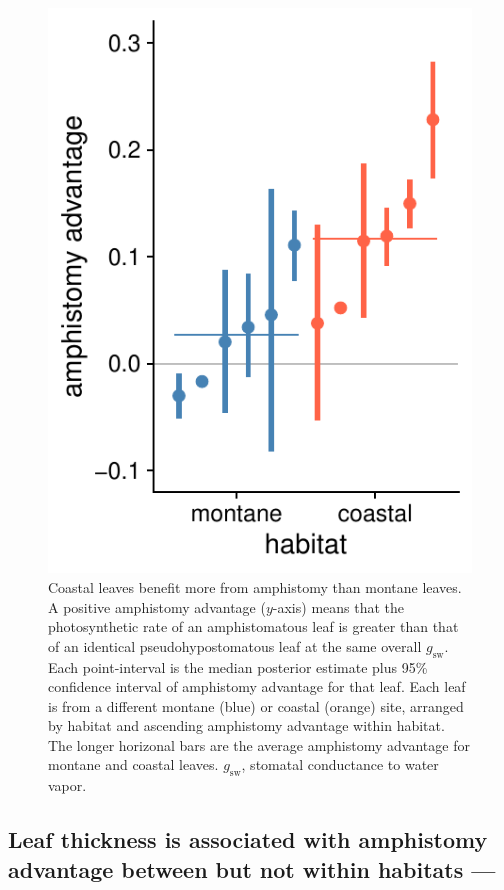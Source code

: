 \documentclass[
  letterpaper,
  DIV=11,
  numbers=noendperiod]{scrartcl}
\begin{document}
\begin{figure}[H]
  \includegraphics{../figures/habitat-aa.pdf}
  \caption{Coastal leaves benefit more from amphistomy than montane leaves. A positive amphistomy advantage ($y$-axis) means that the photosynthetic rate of an amphistomatous leaf is greater than that of an identical pseudohypostomatous leaf at the same overall $g_\mathrm{sw}$. Each point-interval is the median posterior estimate plus 95\% confidence interval of amphistomy advantage for that leaf. Each leaf is from a different montane (blue) or coastal (orange) site, arranged by habitat and ascending amphistomy advantage within habitat. The longer horizonal bars are the average amphistomy advantage for montane and coastal leaves. $g_\mathrm{sw}$, stomatal conductance to water vapor.}
  \label{fig:habitat-aa}
\end{figure}

\hypertarget{leaf-thickness-is-associated-with-amphistomy-advantage-between-but-not-within-habitats}{%
\subsection{Leaf thickness is associated with amphistomy advantage
between but not within habitats
---}\label{leaf-thickness-is-associated-with-amphistomy-advantage-between-but-not-within-habitats}}
\end{document}
